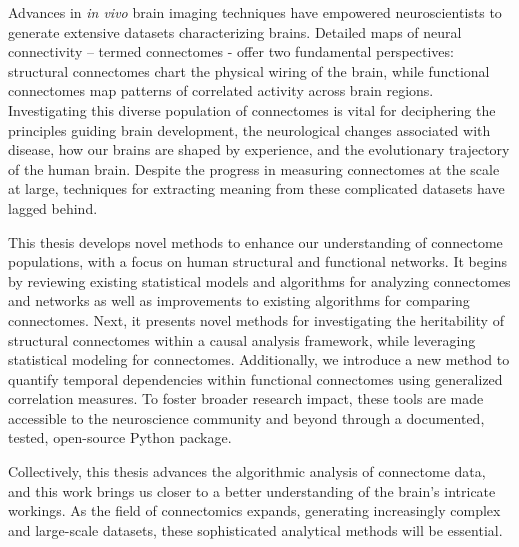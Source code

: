 
Advances in \textit{in vivo} brain imaging techniques have empowered neuroscientists to generate extensive datasets characterizing brains. Detailed maps of neural connectivity – termed connectomes - offer two fundamental perspectives: structural connectomes chart the physical wiring of the brain, while functional connectomes map patterns of correlated activity across brain regions. Investigating this diverse population of connectomes is vital for deciphering the principles guiding brain development, the neurological changes associated with disease, how our brains are shaped by experience, and the evolutionary trajectory of the human brain. Despite the progress in measuring connectomes at the scale at large, techniques for extracting meaning from these complicated datasets have lagged behind.

This thesis develops novel methods to enhance our understanding of connectome populations, with a focus on human structural and functional networks. It begins by reviewing existing statistical models and algorithms for analyzing connectomes and networks as well as improvements to existing algorithms for comparing connectomes. Next, it presents novel methods for investigating the heritability of structural connectomes within a causal analysis framework, while leveraging statistical modeling for connectomes. Additionally, we introduce a new method to quantify temporal dependencies within functional connectomes using generalized correlation measures. To foster broader research impact, these tools are made accessible to the neuroscience community and beyond through a documented, tested, open-source Python package.

Collectively, this thesis advances the algorithmic analysis of connectome data, and this work brings us closer to a better understanding of the brain's intricate workings. As the field of connectomics expands, generating increasingly complex and large-scale datasets, these sophisticated analytical methods will be essential.


